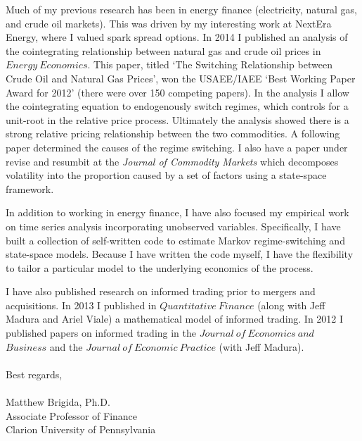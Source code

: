 \documentclass[12pt]{article}
\begin{document}
Much of my previous research has been in energy finance (electricity, natural gas, and crude oil markets).  This was driven by my interesting work at NextEra Energy, where I valued spark spread options.  In 2014 I published an analysis of the cointegrating relationship between natural gas and crude oil prices in $Energy\ Economics$.  This paper, titled `The Switching Relationship between Crude Oil and Natural Gas Prices', won the USAEE/IAEE `Best Working Paper Award for 2012' (there were over 150 competing papers).  In the analysis I allow the cointegrating equation to endogenously switch regimes, which controls for a unit-root in the relative price process. Ultimately the analysis showed there is a strong relative pricing relationship between the two commodities.  A following paper determined the causes of the regime switching.  I also have a paper under revise and resumbit at the {\it Journal of Commodity Markets} which decomposes volatility into the proportion caused by a set of factors using a state-space framework.

In addition to working in energy finance, I have also focused my empirical work on time series analysis incorporating unobserved variables.  Specifically, I have built a collection of self-written code to estimate Markov regime-switching and state-space models.  Because I have written the code myself, I have the flexibility to tailor a particular model to the underlying economics of the process.  



I have also published research on informed trading prior to mergers and acquisitions.  In 2013 I published in $Quantitative\ Finance$ (along with Jeff Madura and Ariel Viale) a mathematical model of informed trading.  In 2012 I published papers on informed trading in the $Journal\ of\ Economics\ and$ \\ $ Business$ and the $Journal\ of\ Economic\ Practice$ (with Jeff Madura). 
\\
\\
Best regards,\\
\\
Matthew Brigida, Ph.D.\\
Associate Professor of Finance\\
Clarion University of Pennsylvania
\end{document}
